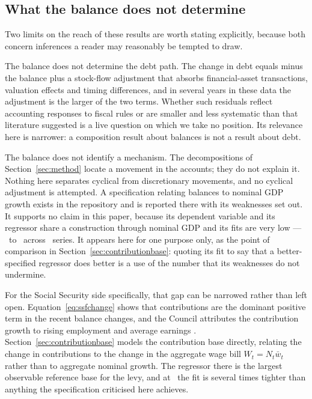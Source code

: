 \subsection{What the balance does not determine}

Two limits on the reach of these results are worth stating explicitly, because both
concern inferences a reader may reasonably be tempted to draw.

The balance does not determine the debt path. The change in debt equals minus the
balance plus a stock-flow adjustment that absorbs financial-asset transactions,
valuation effects and timing differences, and in several years in these data the
adjustment is the larger of the two terms. Whether such residuals reflect accounting
responses to fiscal rules \citep{vonhagen2006} or are smaller and less systematic
than that literature suggested \citep{seiferling2013} is a live question on which we
take no position. Its relevance here is narrower: a composition result about
balances is not a result about debt.

The balance does not identify a mechanism. The decompositions of
Section~\ref{sec:method} locate a movement in the accounts; they do not explain it.
Nothing here separates cyclical from discretionary movements, and no cyclical
adjustment is attempted. A specification relating balances to nominal GDP growth exists
in the repository and is reported there with its weaknesses set out. It supports no claim
in this paper, because its dependent variable and its regressor share a construction
through nominal GDP and its fits are very low --- \GdpRSquaredLow\ to
\GdpRSquaredHigh\ across \GdpRSquaredSeries\ series. It appears here for one purpose
only, as the point of comparison in Section~\ref{sec:contributionbase}: quoting its fit
to say that a better-specified regressor does better is a use of the number that its
weaknesses do not undermine.

For the Social Security side specifically, that gap can be narrowed rather than left open.
Equation~\eqref{eq:ssfchange} shows that contributions are the dominant positive term in
the recent balance changes, and the Council attributes the contribution growth to rising
employment and average earnings \citep{cfp_ss_outturn2025}.
Section~\ref{sec:contributionbase} models the contribution base directly, relating the
change in contributions to the change in the aggregate wage bill $W_t = N_t \bar{w}_t$
rather than to aggregate nominal growth. The regressor there is the largest observable
reference base for the levy, and at \WageBillRSquared\ the fit is several times tighter
than anything the specification criticised here achieves.
